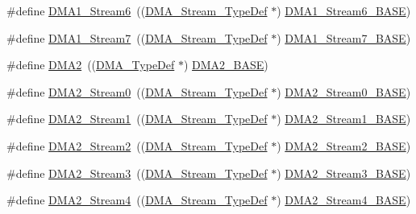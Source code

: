 \begin{DoxyCompactItemize}
\#define \hyperlink{group___peripheral__declaration_gac95127480470900755953f1cfe68567d}{D\+M\+A1\+\_\+\+Stream6}~((\hyperlink{struct_d_m_a___stream___type_def}{D\+M\+A\+\_\+\+Stream\+\_\+\+Type\+Def} $\ast$) \hyperlink{group___peripheral__memory__map_ga58998ddc40adb6361704d6c9dad08125}{D\+M\+A1\+\_\+\+Stream6\+\_\+\+B\+A\+SE})
\item 
\#define \hyperlink{group___peripheral__declaration_ga8ecdeaf43d0f4207dab1fdb4d7bf8d26}{D\+M\+A1\+\_\+\+Stream7}~((\hyperlink{struct_d_m_a___stream___type_def}{D\+M\+A\+\_\+\+Stream\+\_\+\+Type\+Def} $\ast$) \hyperlink{group___peripheral__memory__map_ga82186dd6d3f60995d428b34c041919d7}{D\+M\+A1\+\_\+\+Stream7\+\_\+\+B\+A\+SE})
\item 
\#define \hyperlink{group___peripheral__declaration_ga506520140eec1708bc7570c49bdf972d}{D\+M\+A2}~((\hyperlink{struct_d_m_a___type_def}{D\+M\+A\+\_\+\+Type\+Def} $\ast$) \hyperlink{group___peripheral__memory__map_gab72a9ae145053ee13d1d491fb5c1df64}{D\+M\+A2\+\_\+\+B\+A\+SE})
\item 
\#define \hyperlink{group___peripheral__declaration_ga3a2efe5fd7a7a79be3b08a1670bbd016}{D\+M\+A2\+\_\+\+Stream0}~((\hyperlink{struct_d_m_a___stream___type_def}{D\+M\+A\+\_\+\+Stream\+\_\+\+Type\+Def} $\ast$) \hyperlink{group___peripheral__memory__map_gac4c67b24726ba6b94d03adb351bcec4d}{D\+M\+A2\+\_\+\+Stream0\+\_\+\+B\+A\+SE})
\item 
\#define \hyperlink{group___peripheral__declaration_gae96f15d34d3c41c16fce69bc2878151a}{D\+M\+A2\+\_\+\+Stream1}~((\hyperlink{struct_d_m_a___stream___type_def}{D\+M\+A\+\_\+\+Stream\+\_\+\+Type\+Def} $\ast$) \hyperlink{group___peripheral__memory__map_ga35512bdc3f5e9df4557c2fbe7935d0b1}{D\+M\+A2\+\_\+\+Stream1\+\_\+\+B\+A\+SE})
\item 
\#define \hyperlink{group___peripheral__declaration_ga71bb410664b861ff0520f08976e24ee1}{D\+M\+A2\+\_\+\+Stream2}~((\hyperlink{struct_d_m_a___stream___type_def}{D\+M\+A\+\_\+\+Stream\+\_\+\+Type\+Def} $\ast$) \hyperlink{group___peripheral__memory__map_gaed33a06f08188466f2ede06160984e9a}{D\+M\+A2\+\_\+\+Stream2\+\_\+\+B\+A\+SE})
\item 
\#define \hyperlink{group___peripheral__declaration_gaa6ead6a5ca6b8df70b5505aaeec6fd2e}{D\+M\+A2\+\_\+\+Stream3}~((\hyperlink{struct_d_m_a___stream___type_def}{D\+M\+A\+\_\+\+Stream\+\_\+\+Type\+Def} $\ast$) \hyperlink{group___peripheral__memory__map_gaf3a9480e08c6ae94f4482e0cdaebdd17}{D\+M\+A2\+\_\+\+Stream3\+\_\+\+B\+A\+SE})
\item 
\#define \hyperlink{group___peripheral__declaration_gae32674772021620800275dd3b6d62c2f}{D\+M\+A2\+\_\+\+Stream4}~((\hyperlink{struct_d_m_a___stream___type_def}{D\+M\+A\+\_\+\+Stream\+\_\+\+Type\+Def} $\ast$) \hyperlink{group___peripheral__memory__map_gad1e67740e6301233473f64638145dd1f}{D\+M\+A2\+\_\+\+Stream4\+\_\+\+B\+A\+SE})

\end{DoxyCompactItemize}
